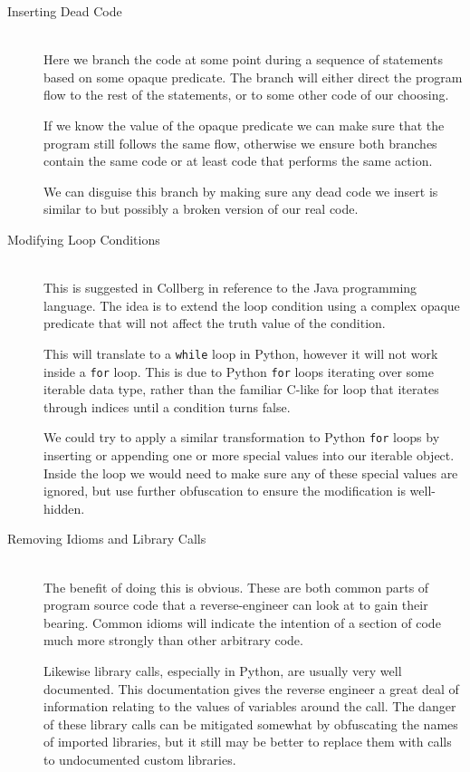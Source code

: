 \documentclass[twoside,a4paper]{report}
\begin{document}
\begin{description}
\item[Inserting Dead Code] \hfill \\
Here we branch the code at some point during a sequence of statements based on some opaque predicate. The branch will either
direct the program flow to the rest of the statements, or to some other code of our choosing.

If we know the value of the opaque predicate we can make sure that the program still follows the same flow, otherwise we
ensure both branches contain the same code or at least code that performs the same action.

We can disguise this branch by making sure any dead code we insert is similar to but possibly a broken version of our real code.

\item[Modifying Loop Conditions] \hfill \\
This is suggested in Collberg in reference to the Java programming language. The idea is to extend the loop condition using a
complex opaque predicate that will not affect the truth value of the condition.

This will translate to a \texttt{while} loop in Python, however it will not work inside a \texttt{for} loop. This is due to
Python \texttt{for} loops iterating over some iterable data type, rather than the familiar C-like for loop that iterates
through indices until a condition turns false.

We could try to apply a similar transformation to Python \texttt{for} loops by inserting or appending one or more special values
into our iterable object. Inside the loop we would need to make sure any of these special values are ignored, but use further
obfuscation to ensure the modification is well-hidden.

\item[Removing Idioms and Library Calls] \hfill \\
The benefit of doing this is obvious. These are both common parts of program source code that a reverse-engineer can look at
to gain their bearing. Common idioms will indicate the intention of a section of code much more strongly than other arbitrary
code.

Likewise library calls, especially in Python, are usually very well documented. This documentation gives the reverse engineer
a great deal of information relating to the values of variables around the call. The danger of these library calls can be
mitigated somewhat by obfuscating the names of imported libraries, but it still may be better to replace them with calls
to undocumented custom libraries.


\end{description}
\end{document}

